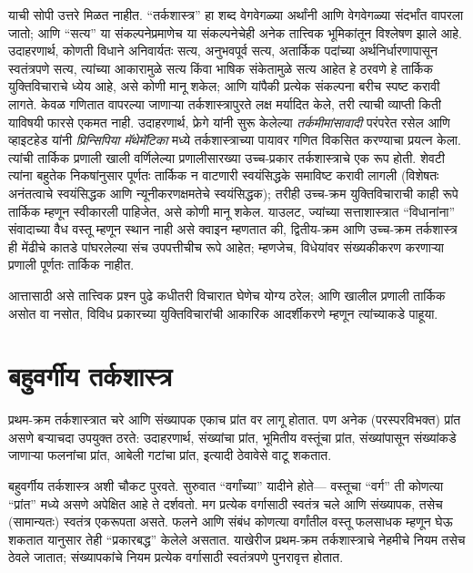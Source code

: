 याची सोपी उत्तरे मिळत नाहीत. ``तर्कशास्त्र'' हा शब्द वेगवेगळ्या अर्थांनी आणि
वेगवेगळ्या संदर्भांत वापरला जातो; आणि ``सत्य'' या संकल्पनेप्रमाणेच या
संकल्पनेचेही अनेक तात्त्विक भूमिकांतून विश्लेषण झाले आहे. उदाहरणार्थ, कोणती
विधाने अनिवार्यतः सत्य, अनुभवपूर्व सत्य, अतार्किक पदांच्या अर्थनिर्धारणापासून
स्वतंत्रपणे सत्य, त्यांच्या आकारामुळे सत्य किंवा भाषिक संकेतामुळे सत्य आहेत
हे ठरवणे हे तार्किक युक्तिविचाराचे ध्येय आहे, असे कोणी मानू शकेल; आणि यांपैकी
प्रत्येक संकल्पना बरीच स्पष्ट करावी लागते. केवळ गणितात वापरल्या जाणाऱ्या
तर्कशास्त्रापुरते लक्ष मर्यादित केले, तरी त्याची व्याप्ती किती याविषयी फारसे
एकमत नाही. उदाहरणार्थ, फ्रेगे यांनी सुरू केलेल्या {\em तर्कमीमांसावादी}
परंपरेत रसेल आणि व्हाइटहेड यांनी \textit{प्रिन्सिपिया मॅथेमॅटिका} मध्ये
तर्कशास्त्राच्या पायावर गणित विकसित करण्याचा प्रयत्न केला. त्यांची तार्किक
प्रणाली खाली वर्णिलेल्या प्रणालीसारख्या उच्च-प्रकार तर्कशास्त्राचे एक रूप
होती. शेवटी त्यांना बहुतेक निकषांनुसार पूर्णतः तार्किक न वाटणारी स्वयंसिद्धके
समाविष्ट करावी लागली (विशेषतः अनंतत्वाचे स्वयंसिद्धक आणि न्यूनीकरणक्षमतेचे
स्वयंसिद्धक); तरीही उच्च-क्रम युक्तिविचाराची काही रूपे तार्किक म्हणून
स्वीकारली पाहिजेत, असे कोणी मानू शकेल. याउलट, ज्यांच्या सत्ताशास्त्रात
``विधानांना'' संवादाच्या वैध वस्तू म्हणून स्थान नाही असे क्वाइन म्हणतात की,
द्वितीय-क्रम आणि उच्च-क्रम तर्कशास्त्र ही मेंढीचे कातडे पांघरलेल्या संच
उपपत्तीचीच रूपे आहेत; म्हणजेच, विधेयांवर संख्यकीकरण करणाऱ्या प्रणाली पूर्णतः
तार्किक नाहीत.

आत्तासाठी असे तात्त्विक प्रश्न पुढे कधीतरी विचारात घेणेच योग्य ठरेल; आणि
खालील प्रणाली तार्किक असोत वा नसोत, विविध प्रकारच्या युक्तिविचारांची आकारिक
आदर्शीकरणे म्हणून त्यांच्याकडे पाहूया.












\section{बहुवर्गीय तर्कशास्त्र}\label{fol:byd:msl:sec}

प्रथम-क्रम तर्कशास्त्रात चरे आणि संख्यापक एकाच प्रांत वर लागू होतात.
पण अनेक (परस्परविभक्त) प्रांत असणे बऱ्याचदा उपयुक्त ठरते: उदाहरणार्थ,
संख्यांचा प्रांत, भूमितीय वस्तूंचा प्रांत, संख्यांपासून संख्यांकडे
जाणाऱ्या फलनांचा प्रांत, आबेली गटांचा प्रांत, इत्यादी ठेवावेसे वाटू
शकतात.

बहुवर्गीय तर्कशास्त्र अशी चौकट पुरवते. सुरुवात ``वर्गांच्या'' यादीने होते---
वस्तूचा ``वर्ग'' ती कोणत्या ``प्रांत'' मध्ये असणे अपेक्षित आहे ते दर्शवतो.
मग प्रत्येक वर्गासाठी स्वतंत्र चले आणि संख्यापक, तसेच (सामान्यतः)
स्वतंत्र एकरूपता असते. फलने आणि संबंध कोणत्या वर्गांतील वस्तू फलसाधक
म्हणून घेऊ शकतात यानुसार तेही ``प्रकारबद्ध'' केलेले असतात. याखेरीज
प्रथम-क्रम तर्कशास्त्राचे नेहमीचे नियम तसेच ठेवले जातात; संख्यापकांचे नियम
प्रत्येक वर्गासाठी स्वतंत्रपणे पुनरावृत्त होतात.

